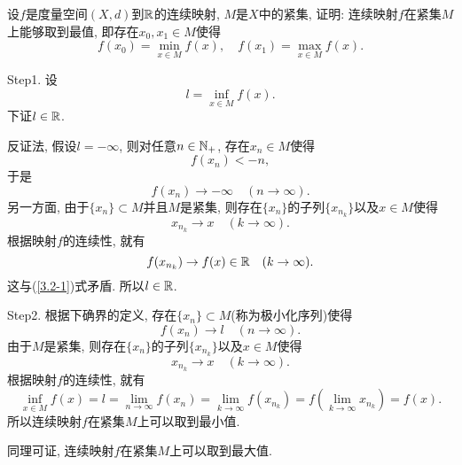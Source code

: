 \documentclass[UTF8,oneside,12pt]{article}  %
\makeatletter
\theoremstyle{DingLi1}
\numberwithin{equation}{section}
\theoremstyle{DingLi2}
\newtheorem{example}{\hskip 2em 问题}[section]
\renewenvironment{proof}[1][\proofname]{\par%
\pushQED{\qed}%
\normalfont \topsep6\p@\@plus6\p@\relax%
\trivlist%
\item[\hskip\labelsep%
#1]\ignorespaces%
}{%
\popQED\endtrivlist\@endpefalse%
}
\renewcommand{\proofname}{\heiti\large\color{blue} 证明}%
\makeatother
\begin{document}
\begin{example}
设$f$是度量空间$(X,d)$到$\Bbb{R}$的连续映射, $M$是$X$中的紧集, 证明: 连续映射$f$在紧集$M$上能够取到最值, 即存在$x_0,x_1\in M$使得
$$f(x_0)=\min_{x\in M}f(x),\quad f(x_1)=\max_{x\in M}f(x).$$
\end{example}
\begin{proof}
Step1. 设
$$l=\inf_{x\in M}f(x).$$
下证$l\in \Bbb{R}$.

反证法, 假设$l=-\infty$, 则对任意$n\in \Bbb{N}_+$, 存在$x_n\in M$使得
\begin{equation*}
f(x_n)<-n,
\end{equation*}
于是
\begin{equation}\label{3.2-1}
f(x_n)\to -\infty\quad (n\to \infty).
\end{equation}
另一方面, 由于$\{x_n\}\subset M$并且$M$是紧集, 则存在$\{x_n\}$的子列$\{x_{n_k}\}$以及$x\in M$使得
$$x_{n_k}\to x\quad (k\to \infty).$$
根据映射$f$的连续性, 就有
$$f(x_{n_k})\to f(x)\in \Bbb{R}\quad (k\to \infty).$$
这与(\ref{3.2-1})式矛盾. 所以$l\in \Bbb{R}$.

Step2. 根据下确界的定义, 存在$\{x_n\}\subset M$(称为极小化序列)使得
$$f(x_n)\to l\quad (n\to \infty).$$
由于$M$是紧集, 则存在$\{x_n\}$的子列$\{x_{n_k}\}$以及$x\in M$使得
$$x_{n_k}\to x\quad (k\to \infty).$$
根据映射$f$的连续性, 就有
$$\inf_{x\in M}f(x)=l=\lim_{n\to \infty}f(x_n)=\lim_{k\to \infty}f(x_{n_k})=f\left(\lim_{k\to \infty} x_{n_k}\right)=f(x).$$
所以连续映射$f$在紧集$M$上可以取到最小值.

同理可证, 连续映射$f$在紧集$M$上可以取到最大值.
\end{proof}
\end{document}
